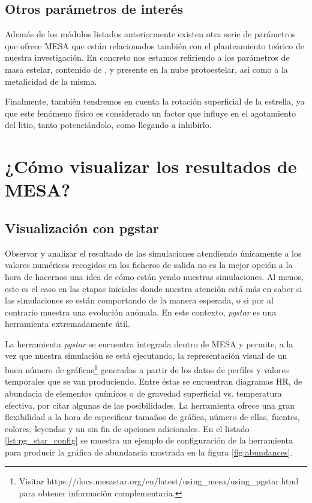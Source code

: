 \subsection{Otros parámetros de interés}
Además de los módulos listados anteriormente existen otra serie de parámetros que ofrece MESA que están relacionados también con el planteamiento teórico de nuestra investigación. En concreto nos estamos refiriendo a los parámetros de masa estelar, contenido de ,  y  presente en la nube protoestelar, así como a la metalicidad de la misma.\par
 
Finalmente, también tendremos en cuenta la rotación superficial de la estrella, ya que este fenómeno físico es considerado un factor que influye en el agotamiento del litio, tanto potenciándolo, como llegando a inhibirlo.\par

\section{¿Cómo visualizar los resultados de MESA?}
\subsection{Visualización con pgstar}
Observar y analizar el resultado de las simulaciones atendiendo únicamente a los valores numéricos recogidos en los ficheros de salida no es la mejor opción a la hora de hacernos una idea de cómo están yendo nuestras simulaciones. Al menos, este es el caso en las etapas iniciales donde nuestra atención está más en saber si las simulaciones se están comportando de la manera esperada, o si por al contrario muestra una evolución anómala. En este contexto, \textit{pgstar} es una herramienta extremadamente útil.

La herramienta \textit{pgstar} se encuentra integrada dentro de MESA y permite, a la vez que nuestra simulación se está ejecutando, la representación visual de un buen número de gráficas\footnote{Visitar https://docs.mesastar.org/en/latest/using\_mesa/using\_pgstar.html para obtener información complementaria.} generadas a partir de los datos de perfiles y valores temporales que se van produciendo. Entre éstas se encuentran diagramas HR, de abundacia de elementos químicos o de gravedad superficial vs. temperatura efectiva, por citar algunas de las posibilidades. La herramienta ofrece una gran flexibilidad a la hora de especificar tamaños de gráfica, número de ellas, fuentes, colores, leyendas y un sin fin de opciones adicionales. En el listado \ref{lst:pg_star_config} se muestra un ejemplo de configuración de la herramienta para producir la gráfica de abundancia mostrada en la figura \ref{fig:abundances}.


